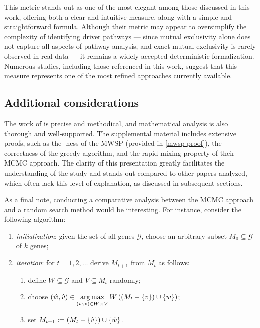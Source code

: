 This metric stands out as one of the most elegant among those discussed in this work, offering both a clear and intuitive measure, along with a simple and straightforward formula. Although their metric may appear to oversimplify the complexity of identifying driver pathways --- since mutual exclusivity alone does not capture all aspects of pathway analysis, and exact mutual exclusivity is rarely observed in real data --- it remains a widely accepted deterministic formalization. Numerous studies, including those referenced in this work, suggest that this measure represents one of the most refined approaches currently available.

\subsection{Additional considerations}

The work of \textcite{dendrix} is precise and methodical, and mathematical analysis is also thorough and well-supported. The supplemental material includes extensive proofs, such as the \NPHard-ness of the MWSP (provided in \cref{mwsp proof}), the correctness of the greedy algorithm, and the rapid mixing property of their MCMC approach. The clarity of this presentation greatly facilitates the understanding of the study and stands out compared to other papers analyzed, which often lack this level of explanation, as discussed in subsequent sections.

As a final note, conducting a comparative analysis between the MCMC approach and a \href{https://en.wikipedia.org/wiki/Random_search}{random search} method would be interesting. For instance, consider the following algorithm:

\begin{enumerate}
    \item \textit{initialization}: given the set of all genes $\mathcal G$, choose an arbitrary subset $M_0 \subseteq \mathcal G$ of $k$ genes;
    \item \textit{iteration}: for $t = 1, 2, \ldots$ derive $M_{t + 1}$ from $M_t$ as follows:

    \begin{enumerate}
        \item define $W \subseteq \mathcal G$ and $V \subseteq M_t$ randomly;
        \item choose $\displaystyle (\hat w, \hat v) \in \operatorname*{arg\,max}_{(w, v) \in W \times V}{W\left(\left(M_t - \{v\}\right) \cup \{w\}\right)}$;
        \item set $M_{t + 1} := \left(M_t - \{\hat v\}\right) \cup \{\hat w\}$.
    \end{enumerate}
\end{enumerate}

